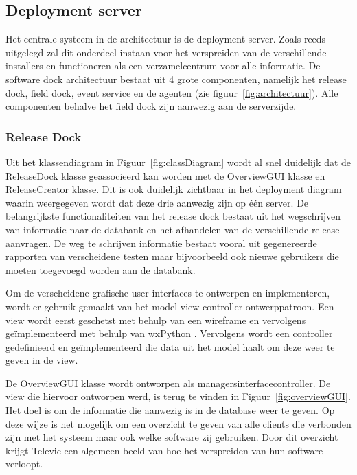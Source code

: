 \subsection{Deployment server}
Het centrale systeem in de architectuur is de deployment server.
Zoals reeds uitgelegd zal dit onderdeel instaan voor het verspreiden van de verschillende installers en functioneren als een verzamelcentrum voor alle informatie.
De software dock architectuur bestaat uit 4 grote componenten, namelijk het release dock, field dock, event service en de agenten (zie figuur~\ref{fig:architectuur}).
Alle componenten behalve het field dock zijn aanwezig aan de serverzijde.

\subsubsection{Release Dock}
Uit het klassendiagram in Figuur~\ref{fig:classDiagram} wordt al snel duidelijk dat de ReleaseDock klasse geassocieerd kan worden met de OverviewGUI klasse en ReleaseCreator klasse.
Dit is ook duidelijk zichtbaar in het deployment diagram waarin weergegeven wordt dat deze drie aanwezig zijn op één server.
De belangrijkste functionaliteiten van het release dock bestaat uit het wegschrijven van informatie naar de databank en het afhandelen van de verschillende release-aanvragen.
De weg te schrijven informatie bestaat vooral uit gegenereerde rapporten van verscheidene testen maar bijvoorbeeld ook nieuwe gebruikers die moeten toegevoegd worden aan de databank.

Om de verscheidene grafische user interfaces te ontwerpen en implementeren, wordt er gebruik gemaakt van het model-view-controller ontwerppatroon.
Een view wordt eerst geschetst met behulp van een wireframe en vervolgens geïmplementeerd met behulp van wxPython \citep{wxPython}.
Vervolgens wordt een controller gedefinieerd en geïmplementeerd die data uit het model haalt om deze weer te geven in de view.

De OverviewGUI klasse wordt ontworpen als managersinterfacecontroller.
De view die hiervoor ontworpen werd, is terug te vinden in Figuur~\vref{fig:overviewGUI}.
Het doel is om de informatie die aanwezig is in de database weer te geven.
Op deze wijze is het mogelijk om een overzicht te geven van alle clients die verbonden zijn met het systeem maar ook welke software zij gebruiken.
Door dit overzicht krijgt Televic een algemeen beeld van hoe het verspreiden van hun software verloopt.

